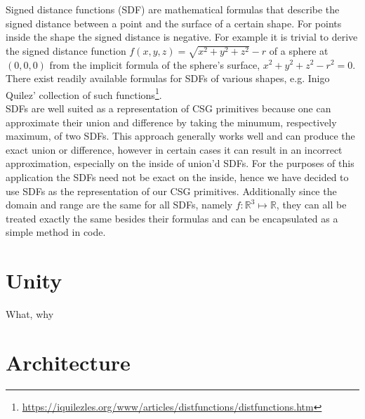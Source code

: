 Signed distance functions (SDF) are mathematical formulas that describe the signed distance between a point and the surface of a certain shape. For points inside the shape the
signed distance is negative. For example it is trivial to derive the signed distance function $f(x,y,z) = \sqrt{x^2 + y^2 + z^2} - r$ of a sphere at $(0, 0, 0)$ from the implicit formula of the sphere's surface, $x^2 + y^2 + z^2 - r^2 = 0$. There exist readily available formulas for SDFs of various shapes, e.g. Inigo Quilez' collection of such functions\footnote{\url{https://iquilezles.org/www/articles/distfunctions/distfunctions.htm}}.\\
SDFs are well suited as a representation of CSG primitives because one can approximate their union and difference by taking the minumum, respectively maximum, of two SDFs. This approach generally works
well and can produce the exact union or difference, however in certain cases it can result in an incorrect approximation, especially on the inside of union'd SDFs. For the purposes of this application the
SDFs need not be exact on the inside, hence we have decided to use SDFs as the representation of our CSG primitives. Additionally since the domain and range are the same for all SDFs, namely
$f\colon \mathbb{R}^3 \mapsto \mathbb{R}$, they can all be treated exactly the same besides their formulas and can be encapsulated as a simple method in code.

\section{Unity}
What, why

\section{Architecture}
